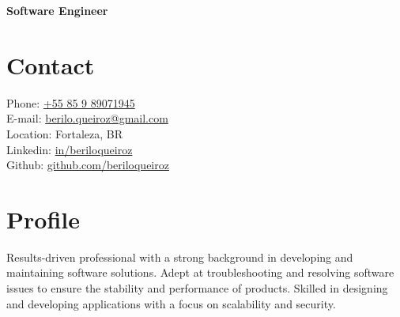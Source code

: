 \documentclass[11pt,a4paper,sans]{moderncv}
\begin{document}
\makecvtitle
\vspace*{-10mm}
\begin{center}\textbf{Software Engineer}\end{center}

\section{Contact}{
  \begin{samepage}
	  \faMobile\enspace Phone: {\color{blue}\href{tel:+5585989071945}{+55 85 9 89071945}} \\
	  \faEnvelope\enspace E-mail: {\color{blue}\href{mailto:berilo.queiroz@gmail.com}{berilo.queiroz@gmail.com}} \\
	  \faHome\enspace Location: Fortaleza, BR \\
	  \faLinkedin\enspace Linkedin: {\color{blue}\href{https://www.linkedin.com/in/beriloqueiroz}{in/beriloqueiroz}}\\
	  \faGithub\enspace Github: {\color{blue}\href{https://github.com/beriloqueiroz}{github.com/beriloqueiroz}}
  \end{samepage}
 }

\section{Profile}
 {
  Results-driven professional with a strong background in developing and maintaining software solutions. Adept at troubleshooting and resolving software issues to ensure the stability and performance of products. Skilled in designing and developing applications with a focus on scalability and security.
 }
\end{document}
